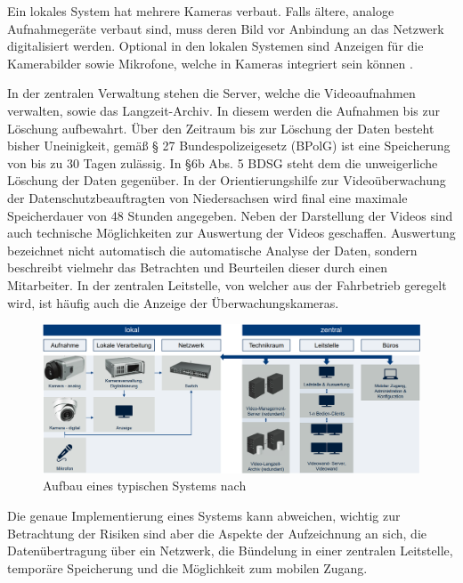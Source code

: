 Ein lokales System hat mehrere Kameras verbaut. Falls ältere, analoge Aufnahmegeräte verbaut sind, muss deren Bild vor Anbindung an das Netzwerk digitalisiert werden.
Optional in den lokalen Systemen sind Anzeigen für die Kamerabilder sowie Mikrofone, welche in Kameras integriert sein können \cite{Reuter.12.02.2019}.

In der zentralen Verwaltung stehen die Server, welche die Videoaufnahmen verwalten, sowie das \glqq{}Langzeit-Archiv\grqq{}. In diesem werden die Aufnahmen bis zur Löschung aufbewahrt.
Über den Zeitraum bis zur Löschung der Daten besteht bisher Uneinigkeit, gemäß § 27 Bundespolizeigesetz (BPolG) ist eine Speicherung von bis zu 30 Tagen zulässig. In  §6b Abs. 5 BDSG
steht dem die unweigerliche Löschung der Daten gegenüber. In der \glqq{}Orientierungshilfe zur Videoüberwachung\grqq{} der Datenschutzbeauftragten von Niedersachsen wird final eine maximale
Speicherdauer von 48 Stunden angegeben\cite{DanielaWindelband.20.April2016}. Neben der Darstellung der Videos sind auch technische Möglichkeiten zur Auswertung der Videos geschaffen.
Auswertung bezeichnet nicht automatisch die automatische Analyse der Daten, sondern beschreibt vielmehr das Betrachten und Beurteilen dieser durch einen Mitarbeiter.
In der zentralen Leitstelle, von welcher aus der Fahrbetrieb geregelt wird, ist häufig auch die Anzeige der Überwachungskameras.
\begin{figure}[ht]
    \begin{center}
        \includegraphics[width= 1\textwidth]{Bilder/architektur.png}
        \caption{Aufbau eines typischen Systems nach \cite{LandesbeauftragtefurdenDatenschutzBadenWurttemberg.2015}}
        \label{fig:architektur}
    \end{center}
\end{figure}

Die genaue Implementierung eines Systems kann abweichen, wichtig zur Betrachtung der Risiken sind aber die Aspekte der
Aufzeichnung an sich, die Datenübertragung über ein Netzwerk, die Bündelung in einer zentralen Leitstelle, temporäre Speicherung und die Möglichkeit zum mobilen Zugang.